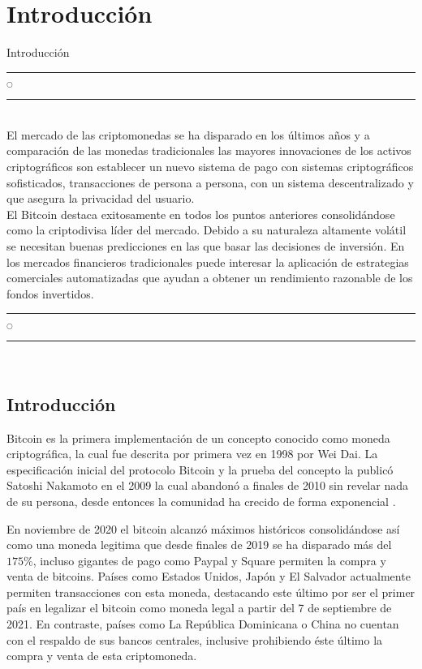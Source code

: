 \chapter[Introducción]{Introducción}{Introducción}\label{Intro}
\noindent
\rule{0.49\textwidth}{0.75pt} $_{\bigcirc}$ \rule{0.49\textwidth}{0.75pt}\\

El mercado de las criptomonedas se ha disparado en los últimos años y a comparación  de las monedas tradicionales las mayores innovaciones de los activos criptográficos son establecer un nuevo sistema de pago con sistemas criptográficos sofisticados, transacciones de persona a persona, con un sistema descentralizado y que asegura la privacidad del usuario.\\
El Bitcoin destaca exitosamente en todos los puntos anteriores consolidándose como la criptodivisa líder del mercado.
Debido a su naturaleza altamente volátil se necesitan buenas predicciones en las que basar las decisiones de inversión. En los mercados financieros tradicionales puede interesar la aplicación de estrategias comerciales automatizadas que ayudan a obtener un rendimiento razonable de los fondos invertidos.\\

\noindent
\rule{0.49\textwidth}{0.75pt} $_{\bigcirc}$ \rule{0.49\textwidth}{0.75pt}\\
\clearpage

\section{Introducción}
Bitcoin es la primera implementación de un concepto conocido como moneda criptográfica, la cual fue descrita por primera vez en 1998 por Wei Dai. La especificación inicial del protocolo Bitcoin y la prueba del concepto la publicó Satoshi Nakamoto en el 2009  la cual abandonó a finales de 2010 sin revelar nada de su persona, desde entonces la comunidad ha crecido de forma exponencial \parencite{nakamotoBitcoinPeertoPeerElectronic2008}.

En noviembre de 2020 el bitcoin alcanzó máximos históricos \parencite{BitcoinUSDBTCUSD} consolidándose así como una moneda legitima que desde finales de 2019 se ha disparado más del $175\%$, incluso gigantes de pago como Paypal y Square permiten la compra y venta de bitcoins. Países como Estados Unidos, Japón y El Salvador actualmente permiten transacciones con esta moneda, destacando este último por ser el primer país en legalizar el bitcoin como moneda legal a partir del 7 de septiembre de 2021. En contraste, países como La República Dominicana o China no cuentan con el respaldo de sus bancos centrales, inclusive prohibiendo éste último la compra y venta de esta criptomoneda.

